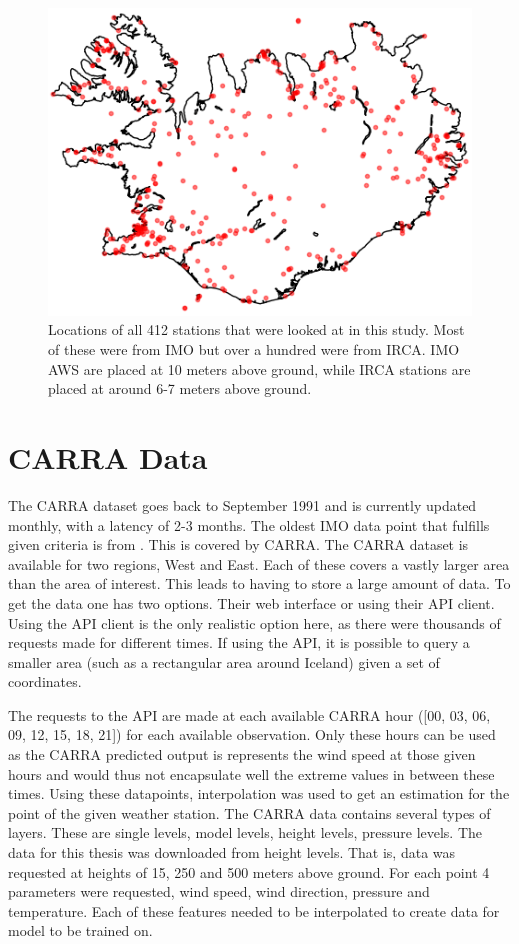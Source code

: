 \begin{figure}
    \centering
    \includegraphics[scale = 1]{Figures/stationsOverIceland_2024-05-16_stripped_to_frame.png}
    \caption[Locations of automatic weather stations in Iceland]{Locations of all 412 stations that were looked at in this study. Most of these were from IMO but over a hundred were from IRCA. IMO AWS are placed at 10 meters above ground, while IRCA stations are placed at around 6-7 meters above ground.}
    \label{fig:aws_map}
\end{figure}

\section{CARRA Data}
The CARRA dataset goes back to September 1991 and is currently updated monthly, with a latency of 2-3 months\cite{carra_information}. The oldest IMO data point that fulfills given criteria is from \startDateVedur. This is covered by CARRA. The CARRA dataset is available for two regions, West and East. Each of these covers a vastly larger area than the area of interest. This leads to having to store a large amount of data. To get the data one has two options. Their web interface or using their API client. Using the API client is the only realistic option here, as there were thousands of requests made for different times. If using the API, it is possible to query a smaller area (such as a rectangular area around Iceland) given a set of coordinates.

The requests to the API are made at each available CARRA hour ([00, 03, 06, 09, 12, 15, 18, 21]) for each available observation. Only these hours can be used as the CARRA predicted output is represents the wind speed at those given hours and would thus not encapsulate well the extreme values in between these times. Using these datapoints, interpolation was used to get an estimation for the point of the given weather station. The CARRA data contains several types of layers. These are single levels, model levels, height levels, pressure levels. The data for this thesis was downloaded from height levels. That is, data was requested at heights of 15, 250 and 500 meters above ground. For each point 4 parameters were requested, wind speed, wind direction, pressure and temperature. Each of these features needed to be interpolated to create data for model to be trained on.

